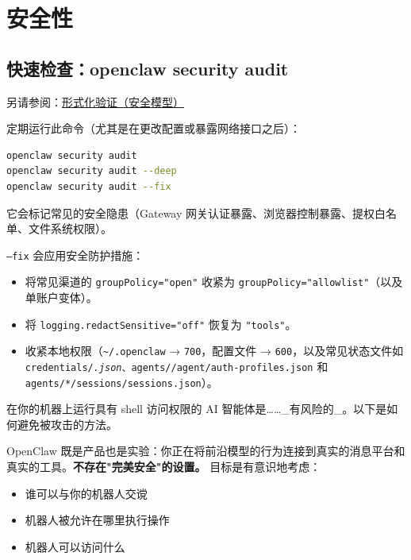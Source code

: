 \clearpage

\section{安全性}


\subsection{快速检查：openclaw security audit}


另请参阅：\href{/security/formal-verification/}{形式化验证（安全模型）}

定期运行此命令（尤其是在更改配置或暴露网络接口之后）：

\begin{lstlisting}[language=bash]
openclaw security audit
openclaw security audit --deep
openclaw security audit --fix
\end{lstlisting}


它会标记常见的安全隐患（Gateway 网关认证暴露、浏览器控制暴露、提权白名单、文件系统权限）。

\texttt{--fix} 会应用安全防护措施：

\begin{itemize}
  \item 将常见渠道的 \texttt{groupPolicy="open"} 收紧为 \texttt{groupPolicy="allowlist"}（以及单账户变体）。
  \item 将 \texttt{logging.redactSensitive="off"} 恢复为 \texttt{"tools"}。
  \item 收紧本地权限（\texttt{\textasciitilde{}/.openclaw} → \texttt{700}，配置文件 → \texttt{600}，以及常见状态文件如 \texttt{credentials/\textit{.json}、\texttt{agents/}/agent/auth-profiles.json} 和 \texttt{agents/*/sessions/sessions.json}）。
\end{itemize}


在你的机器上运行具有 shell 访问权限的 AI 智能体是……\_有风险的\_。以下是如何避免被攻击的方法。

OpenClaw 既是产品也是实验：你正在将前沿模型的行为连接到真实的消息平台和真实的工具。\textbf{不存在"完美安全"的设置。} 目标是有意识地考虑：

\begin{itemize}
  \item 谁可以与你的机器人交谠
  \item 机器人被允许在哪里执行操作
  \item 机器人可以访问什么
\end{itemize}


